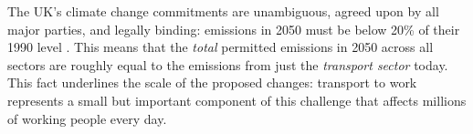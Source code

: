 \documentclass[a4paper, 11pt, twoside]{Thesis}
\begin{document}
The UK's climate change commitments are unambiguous, agreed upon by all major
parties, and legally binding: emissions in 2050 must be below 20\% of their 1990
level \citep{ClimateChangeAct2008}. This means that the \emph{total}
permitted emissions in 2050 across all sectors are roughly equal to the emissions from
just the \emph{transport sector} today. This fact underlines the scale of the
proposed changes: transport to work represents a small but important component
of this challenge that affects millions of working people every day.


\begin{table}[htbp]
\caption[Top 5 UK sectors in terms of greenhouse gas emissions, 1990-2010]{Top 5
UK sectors in terms of greenhouse gas emissions, 1990-2010
(MtCO$_{2}$e). Data from \citet{Decc2011ff}}
\label{table:mtco2}
\end{table}
\end{document}
